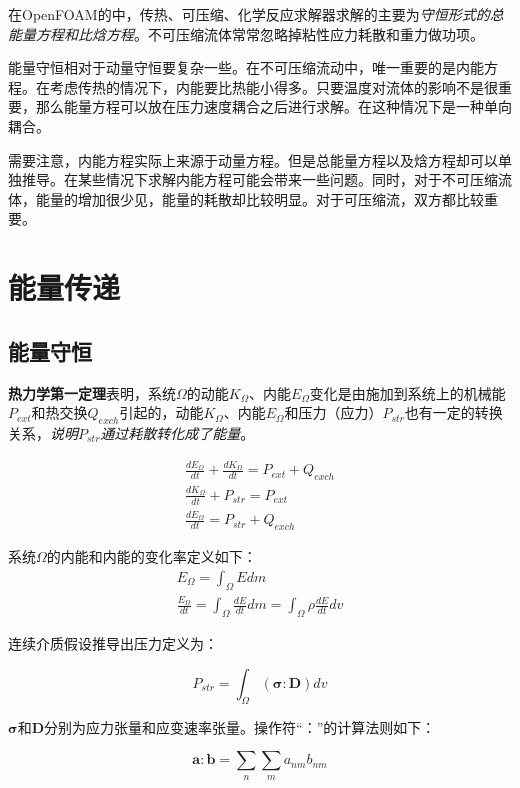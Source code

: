 在OpenFOAM的中，传热、可压缩、化学反应求解器求解的主要为\textit{守恒形式的总能量方程和比焓方程}。不可压缩流体常常忽略掉粘性应力耗散和重力做功项。

能量守恒相对于动量守恒要复杂一些。在不可压缩流动中，唯一重要的是内能方程。在考虑传热的情况下，内能要比热能小得多。只要温度对流体的影响不是很重要，那么能量方程可以放在压力速度耦合之后进行求解。在这种情况下是一种单向耦合。

需要注意，内能方程实际上来源于动量方程。但是总能量方程以及焓方程却可以单独推导。在某些情况下求解内能方程可能会带来一些问题。同时，对于不可压缩流体，能量的增加很少见，能量的耗散却比较明显。对于可压缩流，双方都比较重要。

\section{能量传递}

\subsection{能量守恒}
\textbf{热力学第一定理}表明，系统$\Omega$的动能$K_{\Omega}$、内能$E_{\Omega}$变化是由施加到系统上的机械能$P_{ext}$和热交换$Q_{exch}$引起的，动能$K_{\Omega}$、内能$E_{\Omega}$和压力（应力）$P_{str}$也有一定的转换关系，\textit{说明$P_{str}$通过耗散转化成了能量}。

\begin{gather}
    \frac{dE_{\Omega}}{dt} + \frac{dK_{\Omega}}{dt} = P_{ext} + Q_{exch} \\
    \frac{dK_{\Omega}}{dt} + P_{str} = P_{ext} \\
    \frac{dE_{\Omega}}{dt} = P_{str} + Q_{exch}
\end{gather}

系统$\Omega$的内能和内能的变化率定义如下：
\begin{gather}
    E_{\Omega} = \int_{\Omega} E dm \\
    \frac{E_{\Omega}}{dt} = \int_{\Omega} \frac{dE}{dt} dm = \int_{\Omega} \rho \frac{dE}{dt} dv
\end{gather}

连续介质假设推导出压力定义为：

\begin{equation}
    P_{str} = \int_{\Omega} (\bm{\sigma:D}) dv
\end{equation}

$\bm{\sigma}$和$\bm{D}$分别为应力张量和应变速率张量。操作符“：”的计算法则如下：

\begin{equation}
    \bm{a:b} = \sum_n \sum_m a_{nm}b_{nm}
\end{equation}


